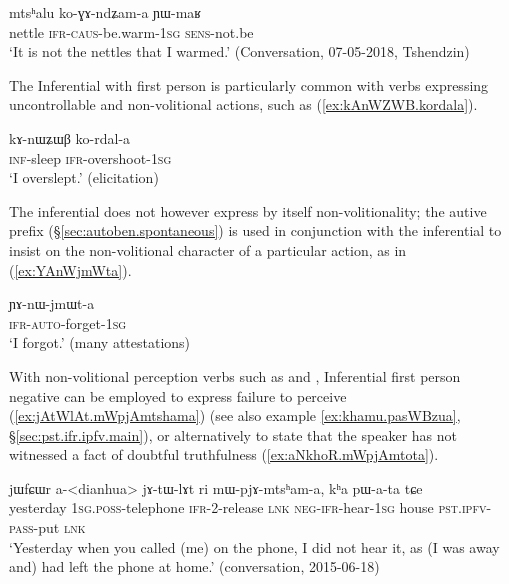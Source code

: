 \begin{exe}
\ex \label{ex:koGAdZama.YWmaR}
\gll  mtsʰalu ko-ɣɤ-ndʑam-a ɲɯ-maʁ \\
nettle \textsc{ifr}-\textsc{caus}-be.warm-\textsc{1sg} \textsc{sens}-not.be \\
\glt `It is not the nettles that I warmed.' (Conversation, 07-05-2018, Tshendzin)
\end{exe}


The Inferential with first person is particularly common with verbs expressing uncontrollable and non-volitional actions, such as (\ref{ex:kAnWZWB.kordala}). 

\begin{exe}
\ex \label{ex:kAnWZWB.kordala}
\gll kɤ-nɯʑɯβ ko-rdal-a \\
\textsc{inf}-sleep \textsc{ifr}-overshoot-\textsc{1sg} \\
\glt `I overslept.' (elicitation)
\end{exe}

The inferential does not however express by itself non-volitionality; the autive prefix  (§\ref{sec:autoben.spontaneous}) is used in conjunction with the inferential to insist on the non-volitional character of a particular action, as in (\ref{ex:YAnWjmWta}).

\begin{exe}
\ex \label{ex:YAnWjmWta}
\gll ɲɤ-nɯ-jmɯt-a \\
 \textsc{ifr}-\textsc{auto}-forget-\textsc{1sg} \\
\glt `I forgot.' (many attestations)
\end{exe}


With non-volitional perception verbs such as  and , Inferential first person negative can be employed to express failure to perceive (\ref{ex:jAtWlAt.mWpjAmtshama}) (see also example \ref{ex:khamu.pasWBzua}, §\ref{sec:pst.ifr.ipfv.main}), or alternatively to state that the speaker has not witnessed a fact of doubtful truthfulness (\ref{ex:aNkhoR.mWpjAmtota}).

\begin{exe}
\ex \label{ex:jAtWlAt.mWpjAmtshama}
\gll jɯfɕɯr a-<dianhua> jɤ-tɯ-lɤt ri mɯ-pjɤ-mtsʰam-a, kʰa pɯ-a-ta tɕe  \\
yesterday \textsc{1sg}.\textsc{poss}-telephone  \textsc{ifr}-2-release \textsc{lnk} \textsc{neg}-\textsc{ifr}-hear-\textsc{1sg} house \textsc{pst}.\textsc{ipfv}-\textsc{pass}-put \textsc{lnk} \\
\glt `Yesterday when you called (me) on the phone, I did not hear it, as (I was away and) had left the phone at home.' (conversation, 2015-06-18)
\end{exe}


